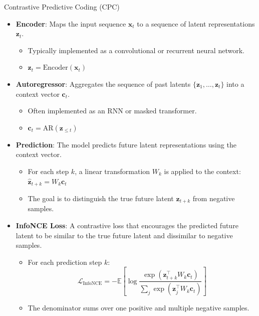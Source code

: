 \begin{frame}[allowframebreaks]{Contrastive Predictive Coding (CPC)}
    \begin{itemize}
        \item \textbf{Encoder}: Maps the input sequence $\mathbf{x}_t$ to a sequence of latent representations $\mathbf{z}_t$.
        \begin{itemize}
            \item Typically implemented as a convolutional or recurrent neural network.
            \item $\mathbf{z}_t = \text{Encoder}(\mathbf{x}_t)$
        \end{itemize}
        \item \textbf{Autoregressor}: Aggregates the sequence of past latents $\{\mathbf{z}_1, \ldots, \mathbf{z}_t\}$ into a context vector $\mathbf{c}_t$.
        \begin{itemize}
            \item Often implemented as an RNN or masked transformer.
            \item $\mathbf{c}_t = \text{AR}(\mathbf{z}_{\leq t})$
        \end{itemize}
        \item \textbf{Prediction}: The model predicts future latent representations using the context vector.
        \begin{itemize}
            \item For each step $k$, a linear transformation $W_k$ is applied to the context: $\hat{\mathbf{z}}_{t+k} = W_k \mathbf{c}_t$
            \item The goal is to distinguish the true future latent $\mathbf{z}_{t+k}$ from negative samples.
        \end{itemize}
        \item \textbf{InfoNCE Loss}: A contrastive loss that encourages the predicted future latent to be similar to the true future latent and dissimilar to negative samples.
        \begin{itemize}
            \item For each prediction step $k$:
            \[
                \mathcal{L}_{\text{InfoNCE}} = -\mathbb{E} \left[ \log \frac{\exp(\mathbf{z}_{t+k}^\top W_k \mathbf{c}_t)}{\sum\limits_{j} \exp(\mathbf{z}_j^\top W_k \mathbf{c}_t)} \right]
            \]
            \item The denominator sums over one positive and multiple negative samples.
        \end{itemize}
    \end{itemize}


\end{frame}
